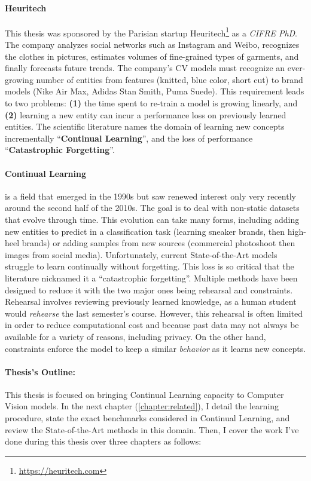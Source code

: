 \paragraph{Heuritech} This thesis was sponsored by the Parisian startup
Heuritech\footnote{\url{https://heuritech.com}} as a \textit{CIFRE PhD}. The company analyzes social
networks such as Instagram and Weibo, recognizes the clothes in pictures, estimates
volumes of fine-grained types of garments, and finally forecasts future trends. The company's
\acf{CV} models must recognize an ever-growing number of entities from features (\eg knitted, blue
color, short cut) to brand models (\eg Nike Air Max, Adidas Stan Smith, Puma Suede). This
requirement leads to two problems: \textbf{(1)} the time spent to re-train a model is growing
linearly, and \textbf{(2)} learning a new entity can incur a performance loss on previously learned
entities. The scientific literature names the domain of learning new concepts incrementally
``\textbf{Continual Learning}'', and the loss of performance ``\textbf{Catastrophic Forgetting}''.

\paragraph{Continual Learning} is a field that emerged in the 1990s but saw renewed interest only
very recently around the second half of the 2010s. The goal is to deal with non-static datasets that
evolve through time. This evolution can take many forms, including adding new entities to predict in
a classification task (\eg learning sneaker brands, then high-heel brands) or adding samples from
new sources (\eg commercial photoshoot then images from social media). Unfortunately, current
State-of-the-Art models struggle to learn continually without forgetting. This loss is so critical
that the literature nicknamed it a ``catastrophic forgetting''. Multiple methods have been designed
to reduce it with the two major ones being rehearsal and constraints. Rehearsal involves reviewing
previously learned knowledge, as a human student would \textit{rehearse} the last semester's course.
However, this rehearsal is often limited in order to reduce computational cost and because past data
may not always be available for a variety of reasons, including privacy. On the other hand,
constraints enforce the model to keep a similar \textit{behavior} as it learns new concepts.

\paragraph{Thesis's Outline:} This thesis is focused on bringing Continual Learning capacity to
Computer Vision models. In the next chapter (\autoref{chapter:related}), I detail the learning
procedure, state the exact benchmarks considered in Continual Learning, and review the
State-of-the-Art methods in this domain. Then, I cover the work I've done during this thesis over
three chapters as follows:

